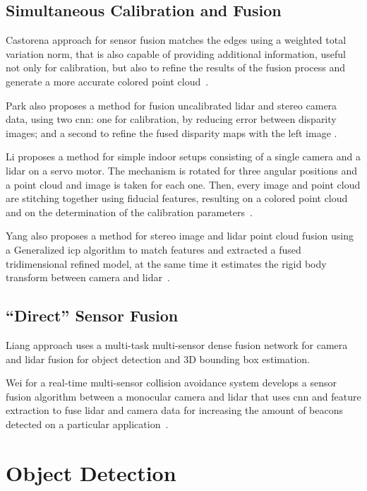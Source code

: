 \subsection{Simultaneous Calibration and Fusion}
Castorena \etal approach for sensor fusion matches the edges using a weighted total variation norm, that is also capable of providing additional information, useful not only for calibration, but also to refine the results of the fusion process and generate a more accurate colored point cloud~\cite{Castorena2016}.

Park \etal also proposes a method for fusion uncalibrated \ac{lidar} and stereo camera data, using two \ac{cnn}: one for calibration, by reducing error between disparity images; and a second to refine the fused disparity maps with the left image \cite{Park2019}. 

Li \etal proposes a method for simple indoor setups consisting of a single camera and a \ac{lidar} on a servo motor. The mechanism is rotated for three angular positions and a point cloud and image is taken for each one. Then, every image and point cloud are stitching together using fiducial features, resulting on a colored point cloud and on the determination of the calibration parameters~\cite{Li2016}. 

Yang \etal also proposes a method for stereo image and \ac{lidar} point cloud fusion using a Generalized \acl{icp} algorithm to match features and extracted a fused tridimensional refined model, at the same time it estimates the rigid body transform between camera and \ac{lidar}~\cite{Yang2017}.


\subsection{``Direct'' Sensor Fusion}
Liang \etal approach uses a multi-task multi-sensor dense fusion network for camera and \ac{lidar} fusion for object detection and 3D bounding box estimation.

Wei \etal for a real-time multi-sensor collision avoidance system develops a sensor fusion algorithm between a monocular camera and \ac{lidar} that uses \ac{cnn} and feature extraction to fuse \ac{lidar} and camera data for increasing the amount of beacons detected on a particular application~\cite{Wei2018}.


\section{Object Detection}
\label{sec:sota:object-detection}

